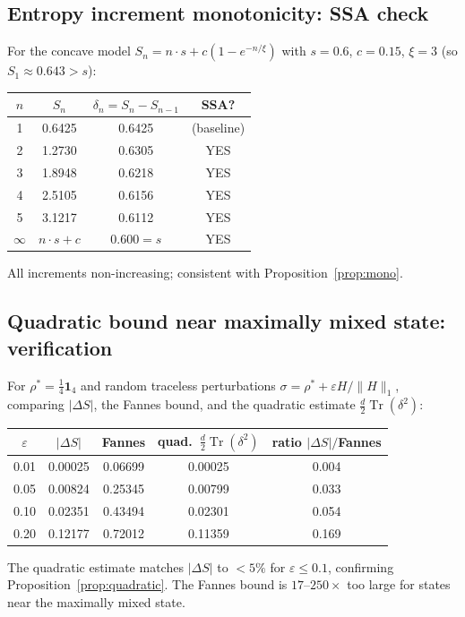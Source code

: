 \documentclass[12pt,a4paper]{article}
\DeclareMathOperator{\Tr}{Tr}
\begin{document}
\subsection{Entropy increment monotonicity: SSA check}\label{sec:numerical}

For the concave model $S_n = n\cdot s + c(1-e^{-n/\xi})$
with $s=0.6$, $c=0.15$, $\xi=3$ (so $S_1 \approx 0.643 > s$):
\begin{center}
\begin{tabular}{c|c|c|c}
$n$ & $S_n$ & $\delta_n = S_n - S_{n-1}$ & SSA? \\ \hline
1 & 0.6425 & 0.6425 & (baseline) \\
2 & 1.2730 & 0.6305 & YES \\
3 & 1.8948 & 0.6218 & YES \\
4 & 2.5105 & 0.6156 & YES \\
5 & 3.1217 & 0.6112 & YES \\
$\infty$ & $n\cdot s + c$ & $0.600 = s$ & YES
\end{tabular}
\end{center}
All increments non-increasing; consistent with Proposition~\ref{prop:mono}.

\subsection{Quadratic bound near maximally mixed state: verification}

For $\rho^*=\frac{1}{4}\mathbf{1}_4$ and random traceless perturbations
$\sigma = \rho^* + \varepsilon H/\|H\|_1$, comparing $|\Delta S|$,
the Fannes bound, and the quadratic estimate $\frac{d}{2}\Tr(\delta^2)$:
\begin{center}
\begin{tabular}{c|c|c|c|c}
$\varepsilon$ & $|\Delta S|$ & Fannes & quad.\ $\frac{d}{2}\Tr(\delta^2)$ & ratio $|\Delta S|/$Fannes \\ \hline
0.01 & 0.00025 & 0.06699 & 0.00025 & 0.004 \\
0.05 & 0.00824 & 0.25345 & 0.00799 & 0.033 \\
0.10 & 0.02351 & 0.43494 & 0.02301 & 0.054 \\
0.20 & 0.12177 & 0.72012 & 0.11359 & 0.169
\end{tabular}
\end{center}
The quadratic estimate matches $|\Delta S|$ to $<5\%$ for $\varepsilon\leq 0.1$,
confirming Proposition~\ref{prop:quadratic}.  The Fannes bound is
$17$–$250\times$ too large for states near the maximally mixed state.
\end{document}
